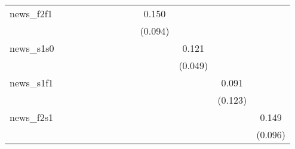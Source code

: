 {\begin{tabular}{l*{12}{c}}
\addlinespace
news\_f2f1   &                     &                     &                     &                     &                     &                     &                     &                     &       0.150         &                     &                     &                     \\
            &                     &                     &                     &                     &                     &                     &                     &                     &     (0.094)         &                     &                     &                     \\
\addlinespace
news\_s1s0   &                     &                     &                     &                     &                     &                     &                     &                     &                     &       0.121\sym{**} &                     &                     \\
            &                     &                     &                     &                     &                     &                     &                     &                     &                     &     (0.049)         &                     &                     \\
\addlinespace
news\_s1f1   &                     &                     &                     &                     &                     &                     &                     &                     &                     &                     &       0.091         &                     \\
            &                     &                     &                     &                     &                     &                     &                     &                     &                     &                     &     (0.123)         &                     \\
\addlinespace
news\_f2s1   &                     &                     &                     &                     &                     &                     &                     &                     &                     &                     &                     &       0.149         \\
            &                     &                     &                     &                     &                     &                     &                     &                     &                     &                     &                     &     (0.096)         \\

\end{tabular}}
